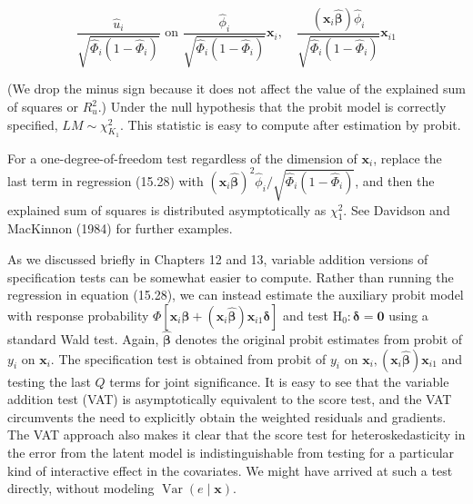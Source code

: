 \documentclass[10pt]{article}
\begin{document}
\begin{equation*}
\frac{\hat{u}_{i}}{\sqrt{\hat{\Phi}_{i}\left(1-\hat{\Phi}_{i}\right)}} \text { on } \frac{\hat{\phi}_{i}}{\sqrt{\hat{\Phi}_{i}\left(1-\hat{\Phi}_{i}\right)}} \mathbf{x}_{i}, \quad \frac{\left(\mathbf{x}_{i} \hat{\boldsymbol{\beta}}\right) \hat{\phi}_{i}}{\sqrt{\hat{\Phi}_{i}\left(1-\hat{\Phi}_{i}\right)}} \mathbf{x}_{i 1} \tag{15.28}
\end{equation*}


(We drop the minus sign because it does not affect the value of the explained sum of squares or $R_{u}^{2}$.) Under the null hypothesis that the probit model is correctly specified, $L M \sim \chi_{K_{1}}^{2}$. This statistic is easy to compute after estimation by probit.

For a one-degree-of-freedom test regardless of the dimension of $\mathbf{x}_{i}$, replace the last term in regression (15.28) with $\left(\mathbf{x}_{i} \hat{\boldsymbol{\beta}}\right)^{2} \hat{\phi}_{i} / \sqrt{\hat{\Phi}_{i}\left(1-\hat{\Phi}_{i}\right)}$, and then the explained sum of squares is distributed asymptotically as $\chi_{1}^{2}$. See Davidson and MacKinnon (1984) for further examples.

As we discussed briefly in Chapters 12 and 13, variable addition versions of specification tests can be somewhat easier to compute. Rather than running the regression in equation (15.28), we can instead estimate the auxiliary probit model with response probability $\Phi\left[\mathbf{x}_{i} \boldsymbol{\beta}+\left(\mathbf{x}_{i} \hat{\boldsymbol{\beta}}\right) \mathbf{x}_{i 1} \boldsymbol{\delta}\right]$ and test $\mathrm{H}_{0}: \boldsymbol{\delta}=\mathbf{0}$ using a standard Wald test. Again, $\hat{\boldsymbol{\beta}}$ denotes the original probit estimates from probit of $y_{i}$ on $\mathbf{x}_{i}$. The specification test is obtained from probit of $y_{i}$ on $\mathbf{x}_{i},\left(\mathbf{x}_{i} \hat{\boldsymbol{\beta}}\right) \mathbf{x}_{i 1}$ and testing the last $Q$ terms for joint significance. It is easy to see that the variable addition test (VAT) is asymptotically equivalent to the score test, and the VAT circumvents the need to explicitly obtain the weighted residuals and gradients. The VAT approach also makes it clear that the score test for heteroskedasticity in the error from the latent model is indistinguishable from testing for a particular kind of interactive effect in the covariates. We might have arrived at such a test directly, without modeling $\operatorname{Var}(e \mid \mathbf{x})$.
\end{document}
